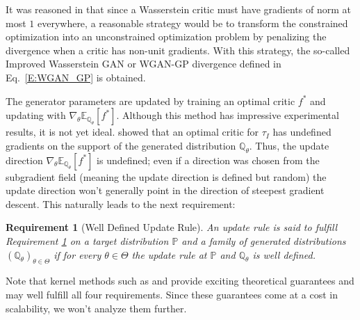 \documentclass{article}
\newtheorem{requirement}{Requirement}
\begin{document}
 It was reasoned in \cite{gulrajani2017improved} that since a Wasserstein critic must have gradients of norm at most $1$ everywhere,
 a reasonable strategy would be to transform the constrained optimization into an unconstrained optimization problem
 by penalizing the divergence when a critic has non-unit gradients.
 With this strategy, the so-called Improved Wasserstein GAN or WGAN-GP divergence defined in Eq.\ \ref{E:WGAN_GP} is obtained.

 The generator parameters are updated by training an optimal critic $f^*$ and updating with $\nabla_\theta\mathbb E_{\mathbb Q_\theta}[f^*]$.
 Although this method has impressive experimental results, it is not yet ideal.
 \cite{petzka2017regularization} showed that an optimal critic for $\tau_I$ has undefined gradients
 on the support of the generated distribution $\mathbb Q_\theta$. Thus,
 the update direction $\nabla_\theta\mathbb E_{\mathbb Q_\theta}[f^*]$ is undefined;
 even if a direction was chosen from the subgradient field (meaning the update direction is defined but random)
 the update direction won't generally point in the direction of steepest gradient descent.
 This naturally leads to the next requirement:

 \begin{requirement}[Well Defined Update Rule]\label{R:differentiable}
 An update rule is said to fulfill Requirement \ref{R:differentiable} on a target distribution $\mathbb P$
 and a family of generated distributions $(\mathbb Q_\theta)_{\theta\in\Theta}$ if
 for every $\theta\in\Theta$ the update rule at $\mathbb P$ and $\mathbb Q_\theta$ is well defined.
  \end{requirement}

 Note that kernel methods such as \cite{dziugaite2015training} and \cite{li2015generative} provide exciting theoretical guarantees
 and may well fulfill all four requirements. Since these guarantees come at a cost in scalability, we won't analyze them further.
\end{document}

